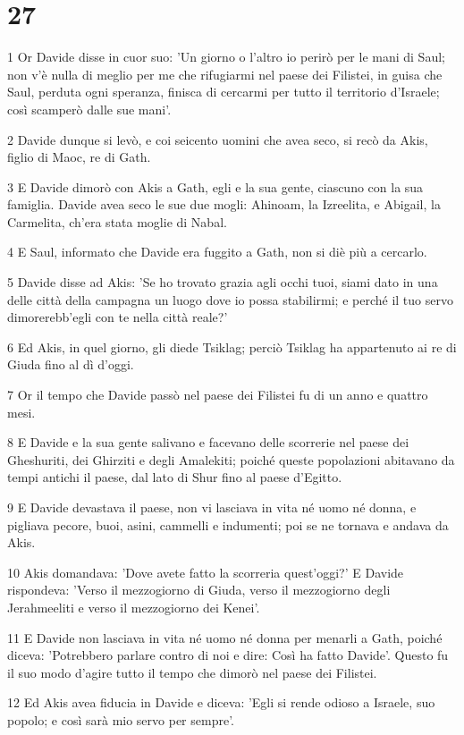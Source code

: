 \chapter{27}

\par 1 Or Davide disse in cuor suo: 'Un giorno o l'altro io perirò per le mani di Saul; non v'è nulla di meglio per me che rifugiarmi nel paese dei Filistei, in guisa che Saul, perduta ogni speranza, finisca di cercarmi per tutto il territorio d'Israele; così scamperò dalle sue mani'.
\par 2 Davide dunque si levò, e coi seicento uomini che avea seco, si recò da Akis, figlio di Maoc, re di Gath.
\par 3 E Davide dimorò con Akis a Gath, egli e la sua gente, ciascuno con la sua famiglia. Davide avea seco le sue due mogli: Ahinoam, la Izreelita, e Abigail, la Carmelita, ch'era stata moglie di Nabal.
\par 4 E Saul, informato che Davide era fuggito a Gath, non si diè più a cercarlo.
\par 5 Davide disse ad Akis: 'Se ho trovato grazia agli occhi tuoi, siami dato in una delle città della campagna un luogo dove io possa stabilirmi; e perché il tuo servo dimorerebb'egli con te nella città reale?'
\par 6 Ed Akis, in quel giorno, gli diede Tsiklag; perciò Tsiklag ha appartenuto ai re di Giuda fino al dì d'oggi.
\par 7 Or il tempo che Davide passò nel paese dei Filistei fu di un anno e quattro mesi.
\par 8 E Davide e la sua gente salivano e facevano delle scorrerie nel paese dei Gheshuriti, dei Ghirziti e degli Amalekiti; poiché queste popolazioni abitavano da tempi antichi il paese, dal lato di Shur fino al paese d'Egitto.
\par 9 E Davide devastava il paese, non vi lasciava in vita né uomo né donna, e pigliava pecore, buoi, asini, cammelli e indumenti; poi se ne tornava e andava da Akis.
\par 10 Akis domandava: 'Dove avete fatto la scorreria quest'oggi?' E Davide rispondeva: 'Verso il mezzogiorno di Giuda, verso il mezzogiorno degli Jerahmeeliti e verso il mezzogiorno dei Kenei'.
\par 11 E Davide non lasciava in vita né uomo né donna per menarli a Gath, poiché diceva: 'Potrebbero parlare contro di noi e dire: Così ha fatto Davide'. Questo fu il suo modo d'agire tutto il tempo che dimorò nel paese dei Filistei.
\par 12 Ed Akis avea fiducia in Davide e diceva: 'Egli si rende odioso a Israele, suo popolo; e così sarà mio servo per sempre'.


